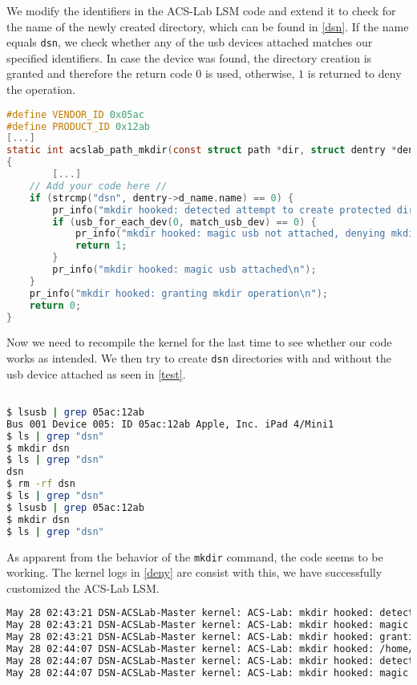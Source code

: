 \documentclass{semdoc}
\begin{document}
We modify the identifiers in the ACS-Lab LSM code and extend it to check for the name of the newly created directory, which can be found in \cref{dsn}.
If the name equals \texttt{dsn}, we check whether any of the usb devices attached matches our specified identifiers. 
In case the device was found, the directory creation is granted and therefore the return code $0$ is used, otherwise, $1$ is returned to deny the operation.

\begin{lstlisting}[language=c, caption={Newly added and modified code to restrict the creation of \texttt{dsn} directories}, label={dsn}]
#define VENDOR_ID 0x05ac
#define PRODUCT_ID 0x12ab
[...]
static int acslab_path_mkdir(const struct path *dir, struct dentry *dentry, umode_t mode)
{
        [...]
	// Add your code here //
	if (strcmp("dsn", dentry->d_name.name) == 0) {
		pr_info("mkdir hooked: detected attempt to create protected directory 'dsn'\n");
		if (usb_for_each_dev(0, match_usb_dev) == 0) {
			pr_info("mkdir hooked: magic usb not attached, denying mkdir\n");
			return 1;
		}
		pr_info("mkdir hooked: magic usb attached\n"); 
	}
	pr_info("mkdir hooked: granting mkdir operation\n");
	return 0;
}
\end{lstlisting}

Now we need to recompile the kernel for the last time to see whether our code works as intended.
We then try to create \texttt{dsn} directories with and without the usb device attached as seen in \cref{test}.

\begin{lstlisting}[language=bash, caption={Creating directories with and without the dedicated usb device attached}, label={test}]

$ lsusb | grep 05ac:12ab
Bus 001 Device 005: ID 05ac:12ab Apple, Inc. iPad 4/Mini1
$ ls | grep "dsn"
$ mkdir dsn
$ ls | grep "dsn"
dsn
$ rm -rf dsn
$ ls | grep "dsn"
$ lsusb | grep 05ac:12ab
$ mkdir dsn
$ ls | grep "dsn"
\end{lstlisting}

As apparent from the behavior of the \texttt{mkdir} command, the code seems to be working.
The kernel logs in \cref{deny} are consist with this, we have successfully customized the ACS-Lab LSM.

\begin{lstlisting}[language=bash, caption={Kernel logs for the directory creation}, label={deny}]
May 28 02:43:21 DSN-ACSLab-Master kernel: ACS-Lab: mkdir hooked: detected attempt to create protected directory 'dsn'
May 28 02:43:21 DSN-ACSLab-Master kernel: ACS-Lab: mkdir hooked: magic usb attached
May 28 02:43:21 DSN-ACSLab-Master kernel: ACS-Lab: mkdir hooked: granting mkdir operation
May 28 02:44:07 DSN-ACSLab-Master kernel: ACS-Lab: mkdir hooked: /home/student/dsn in /home/student
May 28 02:44:07 DSN-ACSLab-Master kernel: ACS-Lab: mkdir hooked: detected attempt to create protected directory 'dsn'
May 28 02:44:07 DSN-ACSLab-Master kernel: ACS-Lab: mkdir hooked: magic usb not attached, denying mkdir
\end{lstlisting}
\end{document}
